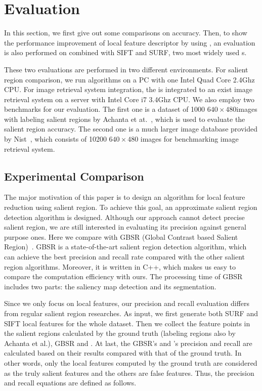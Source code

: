 \section{Evaluation}
\label{sec:evaluation}

In this section, we first give out some comparisons on accuracy. Then, to show the performance improvement of local feature descriptor by using {\sys}, an evaluation is also performed on {\sys} combined with SIFT and SURF, two most widely used {\lfea}s.

These two evaluations are performed in two different environments. For salient region comparison, we run algorithms on a PC with one Intel Quad Core 2.4Ghz CPU. For image retrieval system integration, the {\sys} is integrated to an exist image retrieval system on a server with Intel Core i7 3.4Ghz CPU. We also employ two benchmarks for our evaluation. The first one is a dataset of 1000 $640\times480$images with labeling salient regions by Achanta et at.~\cite{achanta2009frequency}, which is used to evaluate the salient region accuracy. The second one is a much larger image database provided by Nist~\cite{nister2006scalable}, which consists of 10200 $640\times480$ images for benchmarking image retrieval system.

\subsection{Experimental Comparison}
\label{sec:evaluation_comparison}

The major motivation of this paper is to design an algorithm for local feature reduction using salient region. To achieve this goal, an approximate salient region detection algorithm is designed. Although our approach cannot detect precise salient region, we are still interested in evaluating its precision against general purpose ones. Here we compare {\sys} with GBSR (Global Contrast based Salient Region)~\cite{cheng2011global}. GBSR is a state-of-the-art salient region detection algorithm, which can achieve the best precision and recall rate compared with the other salient region algorithms. Moreover, it is written in C++, which makes us easy to compare the computation efficiency with ours. The processing time of GBSR includes two parts: the saliency map detection and its segmentation.

Since we only focus on local features, our precision and recall evaluation differs from regular salient region researches. As input, we first generate both SURF and SIFT local features for the whole dataset. Then we collect the feature points in the salient regions calculated by the ground truth (labeling regions also by Achanta et al.), GBSR and {\sys}. At last, the GBSR's and {\sys}'s precision and recall are calculated based on their results compared with that of the ground truth. In other words, only the local features computed by the ground truth are considered as the truly salient features and the others are false features. Thus, the precision and recall equations are defined as follows.

